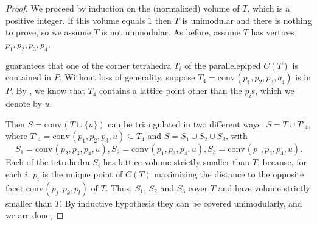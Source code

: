 \documentclass{amsart}
\theoremstyle{plain}
\theoremstyle{definition}
\newcommand{\Vol}{\operatorname{Vol}}
\newcommand{\conv}{\ensuremath{\mathrm{conv}}\hspace{1pt}}
\newcommand{\giulia}[1]{\todo[size=\tiny,color=blue!30]{#1 \\ \hfill --- G.}}
\begin{document}
\begin{proof}
We proceed by induction on the (normalized) volume of $T$, which is a positive integer. If this volume equals $1$ then $T$ is unimodular and there is nothing to prove, so we assume $T$ is not unimodular. As before, assume $T$ has vertices $p_1, p_2, p_3, p_4$.

 guarantees that one of the corner tetrahedra $T_i$ of the parallelepiped $C(T)$ is contained in $P$. Without loss of generality, suppose $T_4 = \conv(p_1, p_2, p_3,q_4)$ is in $P$. By , we know that $T_4$ contains a lattice point other than the $p_i$s, which we denote by $u$. 

Then $S=\conv(T\cup \{u\})$ can be triangulated in two different ways: $S=T \cup T'_4$, where $T'_4 = \conv(p_1, p_2, p_3, u) \subseteq T_4$ and $S= S_1 \cup S_2 \cup S_3$, with
\[
S_1= \conv(p_2,p_3,p_4, u),
S_2=\conv(p_1,p_3,p_4, u),
S_3=\conv(p_1,p_2,p_4, u).
\]
Each of the tetrahedra $S_i$ has lattice volume strictly smaller than $T$, because, for each $i$, $p_i$ is the unique point of $C(T)$ maximizing the distance to the opposite facet $\conv(p_j,p_k,p_l)$ of $T$. Thus, $S_1$, $S_2$ and $S_3$ cover $T$ and have volume strictly smaller than $T$. By inductive hypothesis they can be covered unimodularly, and we are done,

%
\end{proof}
\end{document}
